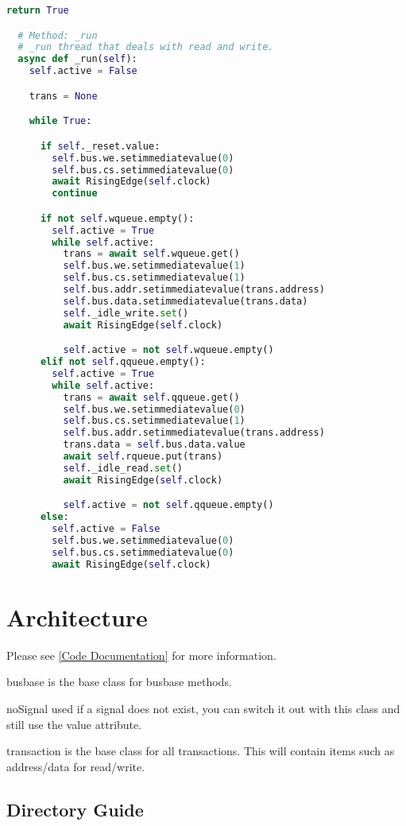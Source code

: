 \begin{lstlisting}[language=Python]
      return True

  # Method: _run
  # _run thread that deals with read and write.
  async def _run(self):
    self.active = False

    trans = None

    while True:

      if self._reset.value:
        self.bus.we.setimmediatevalue(0)
        self.bus.cs.setimmediatevalue(0)
        await RisingEdge(self.clock)
        continue

      if not self.wqueue.empty():
        self.active = True
        while self.active:
          trans = await self.wqueue.get()
          self.bus.we.setimmediatevalue(1)
          self.bus.cs.setimmediatevalue(1)
          self.bus.addr.setimmediatevalue(trans.address)
          self.bus.data.setimmediatevalue(trans.data)
          self._idle_write.set()
          await RisingEdge(self.clock)

          self.active = not self.wqueue.empty()
      elif not self.qqueue.empty():
        self.active = True
        while self.active:
          trans = await self.qqueue.get()
          self.bus.we.setimmediatevalue(0)
          self.bus.cs.setimmediatevalue(1)
          self.bus.addr.setimmediatevalue(trans.address)
          trans.data = self.bus.data.value
          await self.rqueue.put(trans)
          self._idle_read.set()
          await RisingEdge(self.clock)

          self.active = not self.qqueue.empty()
      else:
        self.active = False
        self.bus.we.setimmediatevalue(0)
        self.bus.cs.setimmediatevalue(0)
        await RisingEdge(self.clock)
\end{lstlisting}

\section{Architecture}

Please see \ref{Code Documentation} for more information.

\par
busbase is the base class for busbase methods.
\par
noSignal used if a signal does not exist, you can switch it out with this class and still use the value attribute.
\par
transaction is the base class for all transactions. This will contain items such as address/data for read/write.

\subsection{Directory Guide}

